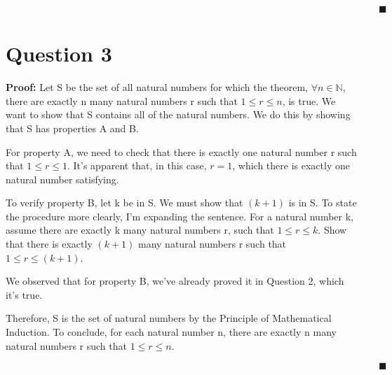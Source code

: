 \documentclass[12pt]{article}
\begin{document}
$\quad \quad \quad \quad \quad \quad \quad \quad \quad \quad \quad \quad \quad \quad \quad \quad \quad \quad \quad \quad \quad \quad \quad \quad \quad \quad \quad \quad \quad \quad \quad \quad \quad \quad \quad \quad \quad \quad  \blacksquare $

\newpage

\section{Question 3}
\textbf{Proof:} Let S be the set of all natural numbers for which the theorem, $\forall n \in \mathbb{N}$, there are exactly n many natural numbers r such that $1 \leq r \leq n$, is true.
We want to show that S contains all of the natural numbers.
We do this by showing that S has properties A and B.

\noindent For property A, we need to check that there is exactly one natural number r such that $1 \leq r \leq 1$.
It's apparent that, in this case, $r=1$, which there is exactly one natural number satisfying.

\noindent To verify property B, let k be in S. We must show that $(k+1)$ is in S.
To state the procedure more clearly, I'm expanding the sentence. 
For a natural number k, assume there are exactly k many natural numbers r, such that $1 \leq r \leq k$.
Show that there is exactly $(k+1)$ many natural numbers r such that $1 \leq r \leq (k+1)$.

\noindent We observed that for property B, we've already proved it in Question 2, which it's true.

\noindent Therefore, S is the set of natural numbers by the Principle of Mathematical Induction. To conclude, for each natural number n, there are exactly n many natural numbers r such that $1 \leq r \leq n$.

$\quad \quad \quad \quad \quad \quad \quad \quad \quad \quad \quad \quad \quad \quad \quad \quad \quad \quad \quad \quad \quad \quad \quad \quad \quad \quad \quad \quad \quad \quad \quad \quad \quad \quad \quad \quad \quad \quad  \blacksquare $
\end{document}
